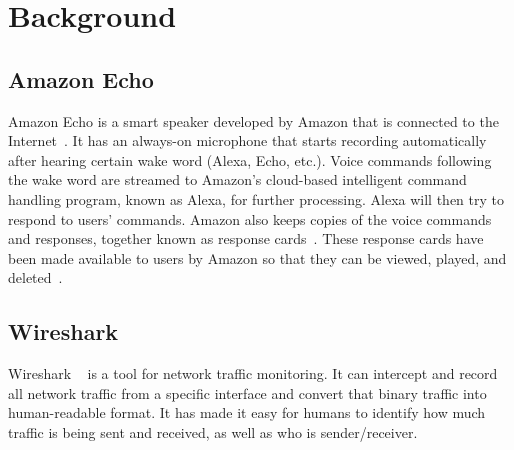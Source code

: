 \section{Background}
\subsection{Amazon Echo}
Amazon Echo is a smart speaker developed by Amazon that is connected to the Internet~\cite{wikipedia_2019}. It has an always-on microphone that starts recording automatically after hearing certain wake word (Alexa, Echo, etc.). Voice commands following the wake word are streamed to Amazon's cloud-based intelligent command handling program, known as Alexa, for further processing. Alexa will then try to respond to users' commands. Amazon also keeps copies of the voice commands and responses, together known as response cards~\cite{ford2019alexa}. These response cards have been made available to users by Amazon so that they can be viewed, played, and deleted~\cite{amazon_2010}.

\subsection{Wireshark}
Wireshark ~\cite{wireshark_wiki} is a tool for network traffic monitoring. It can intercept and record all network traffic from a specific interface and convert that binary traffic into human-readable format. It has made it easy for humans to identify how much traffic is being sent and received, as well as who is sender/receiver.